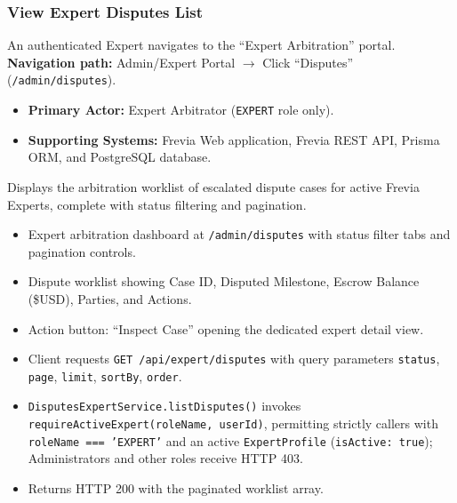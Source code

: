 \subsubsection{ View Expert Disputes List}

An authenticated Expert navigates to the ``Expert Arbitration'' portal.\newline
\textbf{Navigation path:} Admin/Expert Portal $\rightarrow$ Click ``Disputes'' (\texttt{/admin/disputes}).


\begin{itemize}[leftmargin=1.6em,topsep=3pt,itemsep=2pt,parsep=0pt,label=$\bullet$]
      \item \textbf{Primary Actor:} Expert Arbitrator (\texttt{EXPERT} role only).
      \item \textbf{Supporting Systems:} Frevia Web application, Frevia REST API, Prisma ORM, and PostgreSQL database.
\end{itemize}

\noindent Displays the arbitration worklist of escalated dispute cases for active Frevia Experts, complete with status filtering and pagination.

\begin{itemize}[leftmargin=1.6em,topsep=3pt,itemsep=2pt,parsep=0pt,label=$\bullet$]
      \item Expert arbitration dashboard at \texttt{/admin/disputes} with status filter tabs and pagination controls.
      \item Dispute worklist showing Case ID, Disputed Milestone, Escrow Balance (\$USD), Parties, and Actions.
      \item Action button: ``Inspect Case'' opening the dedicated expert detail view.
\end{itemize}

\begin{itemize}[leftmargin=1.6em,topsep=3pt,itemsep=2pt,parsep=0pt,label=$\bullet$]
      \item Client requests \texttt{GET /\allowbreak{}api/\allowbreak{}expert/\allowbreak{}disputes} with query parameters \texttt{status}, \texttt{page}, \texttt{limit}, \texttt{sortBy}, \texttt{order}.
      \item \texttt{DisputesExpertService.listDisputes()} invokes \texttt{requireActiveExpert(roleName, userId)}, permitting strictly callers with \texttt{roleName === 'EXPERT'} and an active \texttt{ExpertProfile} (\texttt{isActive: true}); Administrators and other roles receive HTTP 403.
      \item Returns HTTP 200 with the paginated worklist array.
\end{itemize}

